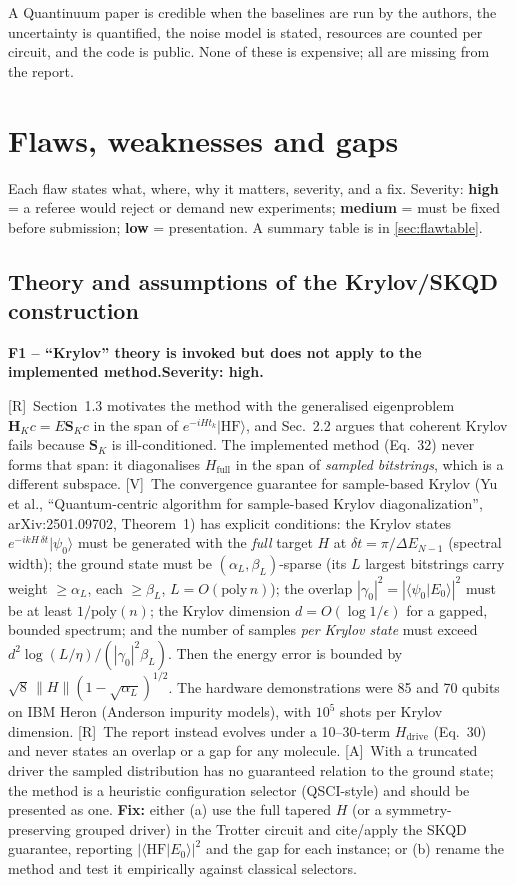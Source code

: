 \documentclass[11pt,a4paper]{article}
\newcommand{\ket}[1]{\lvert #1\rangle}
\newcommand{\braket}[2]{\langle #1\vert #2\rangle}
\newcommand{\Hd}{H_{\mathrm{drive}}}
\newcommand{\Ht}{H_{\mathrm{full}}}
\newcommand{\report}{the report}
\newcommand{\lR}{\textcolor{keyblue}{[R]}}   %
\newcommand{\lV}{\textcolor{keyblue}{[V]}}   %
\newcommand{\lA}{\textcolor{notegray}{[A]}}  %
\newcommand{\sev}[1]{\textbf{Severity: #1.}}
\newcommand{\takeaway}[1]{\par\smallskip\noindent{\bfseries\textcolor{keyblue}{Takeaway.}} #1\par\smallskip}
\newcommand{\flaw}[4]{\par\medskip\noindent\textbf{#1 -- #2.}\quad{\small\textcolor{notegray}{Where: #3.}}\quad\sev{#4}\par\nobreak}
\begin{document}
\takeaway{A Quantinuum paper is credible when the baselines are run by the authors, the uncertainty is quantified, the noise model is stated, resources are counted per circuit, and the code is public. None of these is expensive; all are missing from \report.}

\section{Flaws, weaknesses and gaps}\label{sec:flaws}
Each flaw states what, where, why it matters, severity, and a fix. Severity: \textbf{high} = a referee would reject or demand new experiments; \textbf{medium} = must be fixed before submission; \textbf{low} = presentation. A summary table is in \cref{sec:flawtable}.

\subsection{Theory and assumptions of the Krylov/SKQD construction}

\flaw{F1}{``Krylov'' theory is invoked but does not apply to the implemented method}{p.~4, Eqs.~(4)--(5); p.~8, Eqs.~(30)--(32)}{high}
\lR\ Section~1.3 motivates the method with the generalised eigenproblem $\mathbf H_K c = E\mathbf S_K c$ in the span of $e^{-iHt_k}\ket{\mathrm{HF}}$, and Sec.~2.2 argues that coherent Krylov fails because $\mathbf S_K$ is ill-conditioned. The implemented method (Eq.~32) never forms that span: it diagonalises $\Ht$ in the span of \emph{sampled bitstrings}, which is a different subspace. \lV\ The convergence guarantee for sample-based Krylov (Yu et al., ``Quantum-centric algorithm for sample-based Krylov diagonalization'', arXiv:2501.09702, Theorem~1) has explicit conditions: the Krylov states $e^{-ikH\,\delta t}\ket{\psi_0}$ must be generated with the \emph{full} target $H$ at $\delta t=\pi/\Delta E_{N-1}$ (spectral width); the ground state must be $(\alpha_L,\beta_L)$-sparse (its $L$ largest bitstrings carry weight $\ge\alpha_L$, each $\ge\beta_L$, $L=O(\mathrm{poly}\,n)$); the overlap $|\gamma_0|^2=|\braket{\psi_0}{E_0}|^2$ must be at least $1/\mathrm{poly}(n)$; the Krylov dimension $d=O(\log 1/\epsilon)$ for a gapped, bounded spectrum; and the number of samples \emph{per Krylov state} must exceed $d^2\log(L/\eta)/(|\gamma_0|^2\beta_L)$. Then the energy error is bounded by $\sqrt8\,\|H\|(1-\sqrt{\alpha_L})^{1/2}$. The hardware demonstrations were 85 and 70 qubits on IBM Heron (Anderson impurity models), with $10^5$ shots per Krylov dimension. \lR\ The report instead evolves under a 10--30-term $\Hd$ (Eq.~30) and never states an overlap or a gap for any molecule. \lA\ With a truncated driver the sampled distribution has no guaranteed relation to the ground state; the method is a heuristic configuration selector (QSCI-style) and should be presented as one. \textbf{Fix:} either (a) use the full tapered $H$ (or a symmetry-preserving grouped driver) in the Trotter circuit and cite/apply the SKQD guarantee, reporting $|\braket{\mathrm{HF}}{E_0}|^2$ and the gap for each instance; or (b) rename the method and test it empirically against classical selectors.
\end{document}
